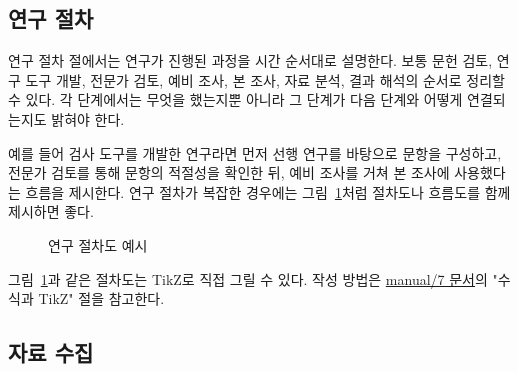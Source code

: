 \subsection{연구 절차}


연구 절차 절에서는 연구가 진행된 과정을 시간 순서대로 설명한다.
보통 문헌 검토, 연구 도구 개발, 전문가 검토, 예비 조사, 본 조사, 자료 분석, 결과 해석의 순서로 정리할 수 있다.
각 단계에서는 무엇을 했는지뿐 아니라 그 단계가 다음 단계와 어떻게 연결되는지도 밝혀야 한다.

예를 들어 검사 도구를 개발한 연구라면 먼저 선행 연구를 바탕으로 문항을 구성하고, 전문가 검토를 통해 문항의 적절성을 확인한 뒤, 예비 조사를 거쳐 본 조사에 사용했다는 흐름을 제시한다.
연구 절차가 복잡한 경우에는 그림~\ref{fig:tikz-process-example}처럼 절차도나 흐름도를 함께 제시하면 좋다.

\begin{figure}[htbp]
    \centering
    \footnotesize
    \caption{연구 절차도 예시}
    \label{fig:tikz-process-example}
\end{figure}

그림~\ref{fig:tikz-process-example}과 같은 절차도는 TikZ로 직접 그릴 수 있다. 작성 방법은 \href{../manual/8-KNUE_THESIS_TEMPLATE_USAGE.md}{manual/7 문서}의 "수식과 TikZ" 절을 참고한다.

\subsection{자료 수집}


